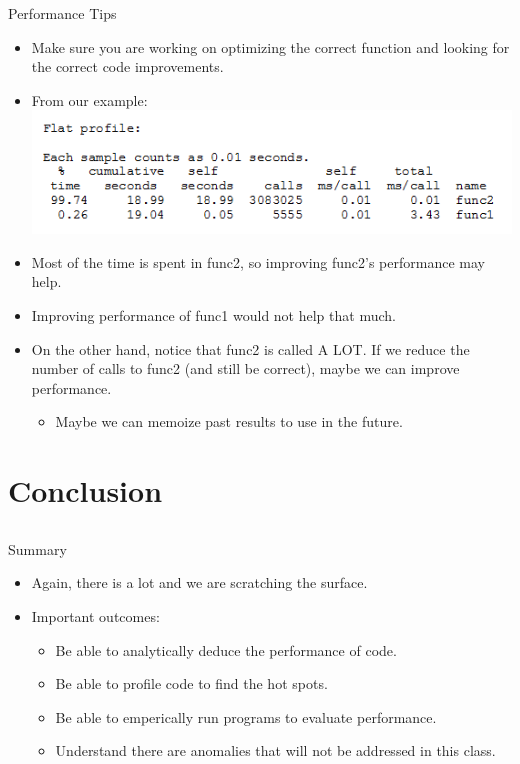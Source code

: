 \documentclass{beamer}
\begin{document}

\begin{frame}{Performance Tips}
\begin{itemize}
\item Make sure you are working on optimizing the correct function and looking for the correct code improvements.
\item From our example:\\
\includegraphics[width=1.0\textwidth]{../imgs/prof3.png}
\item Most of the time is spent in func2, so improving func2's performance may help.
\item Improving performance of func1 would not help that much.
\item On the other hand, notice that func2 is called A LOT.  If we reduce the number of calls to func2 (and still be correct), maybe we can improve performance.
\begin{itemize}
\item Maybe we can memoize past results to use in the future.
\end{itemize}
\end{itemize}
\end{frame}

\section{Conclusion}
\subsection{}

\begin{frame}{Summary}
\begin{itemize}
\item Again, there is a lot and we are scratching the surface.
\item Important outcomes:
\begin{itemize}
\item Be able to analytically deduce the performance of code.
\item Be able to profile code to find the hot spots.
\item Be able to emperically run programs to evaluate performance.
\item Understand there are anomalies that will not be addressed in this class.
\end{itemize}
\end{itemize}
\end{frame}
\end{document}
